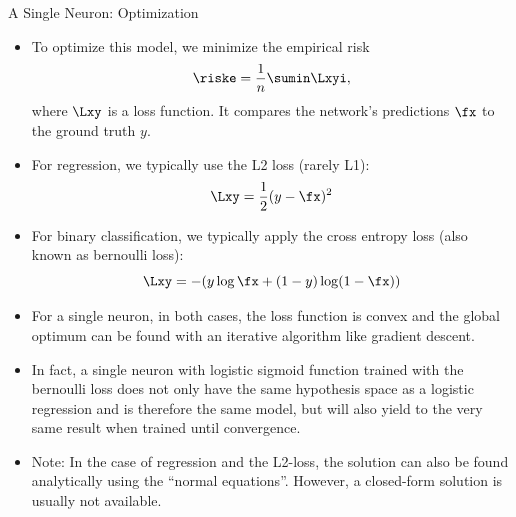 \begin{vbframe} {A Single Neuron: Optimization}
\begin{itemize}
\item To optimize this model, we minimize the empirical risk 
$$\riske = \frac{1}{n} \sumin \Lxyi,$$
where $\Lxy$ is a loss function. It compares the network's predictions $\fx$ to the ground truth $y$. 
\item For regression, we typically use the L2 loss (rarely L1): $$\Lxy = \frac{1}{2}(y - \fx)^2$$
\item For binary classification, we typically apply the cross entropy loss (also known as bernoulli loss): $$\Lxy = -(y \log \fx + (1 - y) \log(1 - \fx))$$
\framebreak 

\vspace{.5cm}
\item For a single neuron, in both cases, the loss function is convex and the global optimum can be found with an iterative algorithm like gradient descent. 
\item In fact, a single neuron with logistic sigmoid function trained with the bernoulli loss does not only have the same hypothesis space as a logistic regression and is therefore the same model, but will also yield to the very same result when trained until convergence.
\item Note: In the case of regression and the L2-loss, the solution can
also be found analytically using the “normal equations”. However,
a closed-form solution is usually not available.
\end{itemize}
\end{vbframe} 

\endlecture

